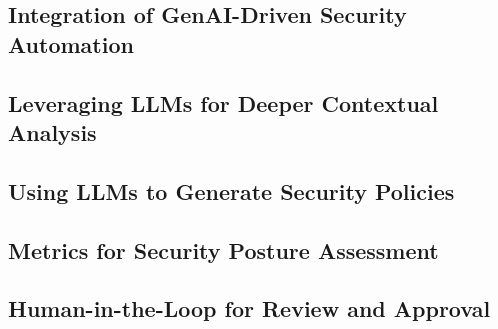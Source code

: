 
\subsection{Integration of GenAI-Driven Security Automation} %
\label{sub:Integration of GenAI-Driven Security Automation}



\subsection{Leveraging LLMs for Deeper Contextual Analysis} %
\label{sec:Leveraging LLMs for Deeper Contextual Analysis}



\subsection{Using LLMs to Generate Security Policies} %
\label{sec:Using LLMs to Generate Security Policies}



\subsection{Metrics for Security Posture Assessment} %
\label{sec:Metrics for Security Posture Assessment}


\subsection{Human-in-the-Loop for Review and Approval} %
\label{sub:Human-in-the-Loop for Review and Approval}

